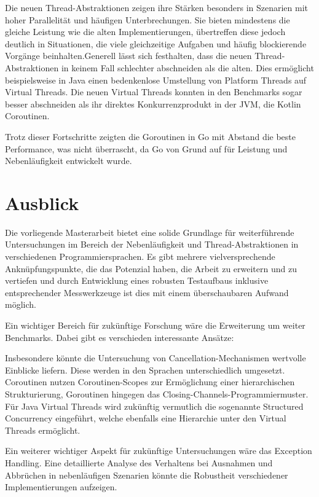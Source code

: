 \documentclass[fontsize=12pt,paper=a4,twoside=semi,parskip=half-,headsepline,headinclude]{scrreprt}
\begin{document}
Die neuen Thread-Abstraktionen zeigen ihre Stärken besonders in Szenarien mit hoher Parallelität und häufigen Unterbrechungen. Sie bieten mindestens die gleiche Leistung wie die alten Implementierungen, übertreffen diese jedoch deutlich in Situationen, die viele gleichzeitige Aufgaben und häufig blockierende Vorgänge beinhalten.Generell lässt sich festhalten, dass die neuen Thread-Abstraktionen in keinem Fall schlechter abschneiden als die alten. Dies ermöglicht beispielsweise in Java einen bedenkenlose Umstellung von Platform Threads auf Virtual Threads. Die neuen Virtual Threads konnten in den Benchmarks sogar besser abschneiden als ihr direktes Konkurrenzprodukt in der JVM, die Kotlin Coroutinen.

Trotz dieser Fortschritte zeigten die Goroutinen in Go mit Abstand die beste Performance, was nicht überrascht, da Go von Grund auf für Leistung und Nebenläufigkeit entwickelt wurde.


\section{Ausblick}

Die vorliegende Masterarbeit bietet eine solide Grundlage für weiterführende Untersuchungen im Bereich der Nebenläufigkeit und Thread-Abstraktionen in verschiedenen Programmiersprachen. Es gibt mehrere vielversprechende Anknüpfungspunkte, die das Potenzial haben, die Arbeit zu erweitern und zu vertiefen und durch Entwicklung eines robusten Testaufbaus inklusive entsprechender Messwerkzeuge ist dies mit einem überschaubaren Aufwand möglich.

Ein wichtiger Bereich für zukünftige Forschung wäre die Erweiterung um weiter Benchmarks. Dabei gibt es verschieden interessante Ansätze:

Insbesondere könnte die Untersuchung von Cancellation-Mechanismen wertvolle Einblicke liefern. Diese werden in den Sprachen unterschiedlich umgesetzt. Coroutinen nutzen Coroutinen-Scopes zur Ermöglichung einer hierarchischen Strukturierung, Goroutinen hingegen das Closing-Channels-Programmiermuster.
Für Java Virtual Threads wird zukünftig vermutlich die sogenannte Structured Concurrency eingeführt, welche ebenfalls eine Hierarchie unter den Virtual Threads ermöglicht.

Ein weiterer wichtiger Aspekt für zukünftige Untersuchungen wäre das Exception Handling. Eine detaillierte Analyse des Verhaltens bei Ausnahmen und Abbrüchen in nebenläufigen Szenarien könnte die Robustheit verschiedener Implementierungen aufzeigen.
\end{document}
